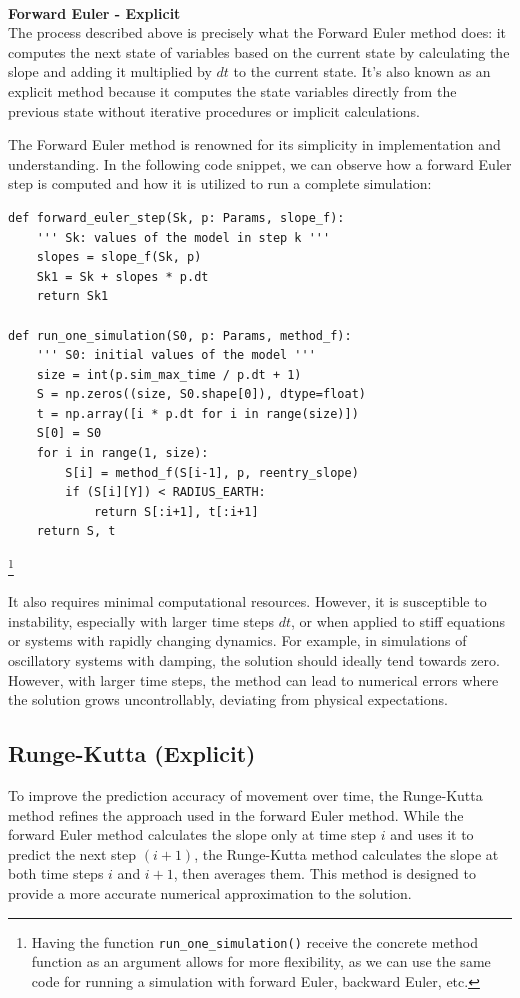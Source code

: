 \documentclass[runningheads]{llncs}
\begin{document}
\textbf{\\Forward Euler - Explicit\\}
The process described above is precisely what the Forward Euler method does: it computes the next state of variables based on the current state by calculating the slope and adding it multiplied by \( dt \) to the current state. It's also known as an explicit method because it computes the state variables directly from the previous state without iterative procedures or implicit calculations.

The Forward Euler method is renowned for its simplicity in implementation and understanding. In the following code snippet, we can observe how a forward Euler step is computed and how it is utilized to run a complete simulation:

\begin{verbatim}
def forward_euler_step(Sk, p: Params, slope_f): 
    ''' Sk: values of the model in step k '''
    slopes = slope_f(Sk, p)
    Sk1 = Sk + slopes * p.dt
    return Sk1

def run_one_simulation(S0, p: Params, method_f):
    ''' S0: initial values of the model '''
    size = int(p.sim_max_time / p.dt + 1)
    S = np.zeros((size, S0.shape[0]), dtype=float)
    t = np.array([i * p.dt for i in range(size)])
    S[0] = S0
    for i in range(1, size):
        S[i] = method_f(S[i-1], p, reentry_slope)
        if (S[i][Y]) < RADIUS_EARTH:
            return S[:i+1], t[:i+1]
    return S, t
\end{verbatim}
\footnote{Having the function \texttt{run\_one\_simulation()} receive the concrete method function as an argument allows for more flexibility, as we can use the same code for running a simulation with forward Euler, backward Euler, etc.}


It also requires minimal computational resources. However, it is susceptible to instability, especially with larger time steps \( dt \), or when applied to stiff equations or systems with rapidly changing dynamics. For example, in simulations of oscillatory systems with damping, the solution should ideally tend towards zero. However, with larger time steps, the method can lead to numerical errors where the solution grows uncontrollably, deviating from physical expectations.


\subsection{Runge-Kutta (Explicit)}
To improve the prediction accuracy of movement over time, the Runge-Kutta method refines the approach used in the forward Euler method. While the forward Euler method calculates the slope only at time step \( i \) and uses it to predict the next step \( (i+1) \), the Runge-Kutta method calculates the slope at both time steps \( i \) and \( i+1 \), then averages them. This method is designed to provide a more accurate numerical approximation to the solution.
\end{document}
